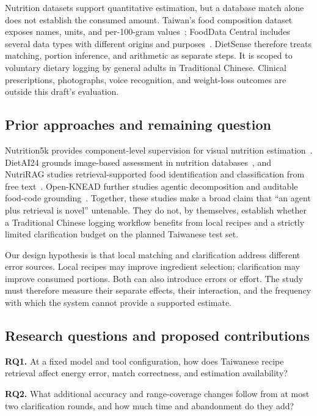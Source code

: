 \documentclass[11pt,a4paper]{article}
\begin{document}
Nutrition datasets support quantitative estimation, but a database match alone does not establish the consumed amount. Taiwan's food composition dataset exposes names, units, and per-100-gram values~\cite{tfda}; FoodData Central includes several data types with different origins and purposes~\cite{usda}. DietSense therefore treats matching, portion inference, and arithmetic as separate steps. It is scoped to voluntary dietary logging by general adults in Traditional Chinese. Clinical prescriptions, photographs, voice recognition, and weight-loss outcomes are outside this draft's evaluation.

\subsection{Prior approaches and remaining question}
Nutrition5k provides component-level supervision for visual nutrition estimation~\cite{nutrition5k}. DietAI24 grounds image-based assessment in nutrition databases~\cite{dietai24}, and NutriRAG studies retrieval-supported food identification and classification from free text~\cite{nutrirag}. Open-KNEAD further studies agentic decomposition and auditable food-code grounding~\cite{openknead}. Together, these studies make a broad claim that ``an agent plus retrieval is novel'' untenable. They do not, by themselves, establish whether a Traditional Chinese logging workflow benefits from local recipes and a strictly limited clarification budget on the planned Taiwanese test set.

Our design hypothesis is that local matching and clarification address different error sources. Local recipes may improve ingredient selection; clarification may improve consumed portions. Both can also introduce errors or effort. The study must therefore measure their separate effects, their interaction, and the frequency with which the system cannot provide a supported estimate.

\subsection{Research questions and proposed contributions}
\textbf{RQ1.} At a fixed model and tool configuration, how does Taiwanese recipe retrieval affect energy error, match correctness, and estimation availability?

\textbf{RQ2.} What additional accuracy and range-coverage changes follow from at most two clarification rounds, and how much time and abandonment do they add?
\end{document}
